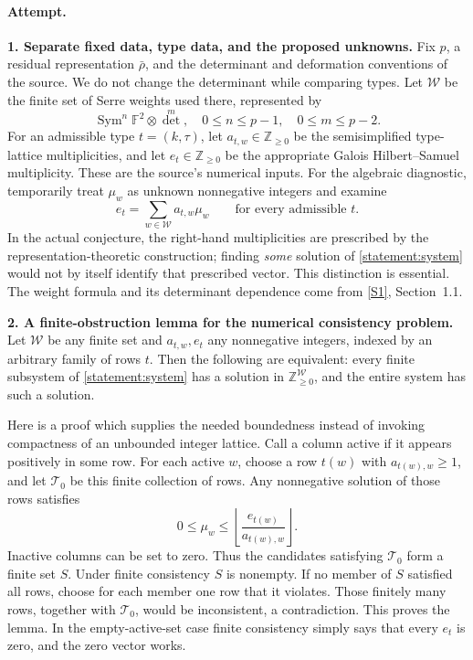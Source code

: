 \documentclass[11pt,a4paper]{article}
\newcommand{\Z}{\mathbb{Z}}
\newcommand{\F}{\mathbb{F}}
\newcommand{\sref}[2]{\hyperlink{source:#1:#2}{[S#2]}}
\numberwithin{equation}{section}
\begin{document}
\paragraph{Attempt.}
\textbf{1. Separate fixed data, type data, and the proposed unknowns.}
Fix $p$, a residual representation $\bar\rho$, and the determinant and
deformation conventions of the source. We do not change the determinant
while comparing types. Let $\mathcal W$ be the finite set of Serre
weights used there, represented by
\[
 \operatorname{Sym}^n\F^2\otimes\det^m,
       \quad 0\le n\le p-1,\quad0\le m\le p-2.
\]
For an admissible type $t=(k,\tau)$, let $a_{t,w}\in\Z_{\ge0}$ be the
semisimplified type-lattice multiplicities, and let $e_t\in\Z_{\ge0}$
be the appropriate Galois Hilbert--Samuel multiplicity. These are the
source's numerical inputs. For the algebraic diagnostic, temporarily
treat $\mu_w$ as unknown nonnegative integers and examine
\begin{equation}\label{statement:system}
 e_t=\sum_{w\in\mathcal W}a_{t,w}\mu_w
                      \qquad\text{for every admissible }t.
\end{equation}
In the actual conjecture, the right-hand multiplicities are prescribed
by the representation-theoretic construction; finding \emph{some}
solution of \eqref{statement:system} would not by itself identify that
prescribed vector. This distinction is essential. The weight formula
and its determinant dependence come from \sref{statement}{1}, Section~1.1.

\textbf{2. A finite-obstruction lemma for the numerical consistency problem.}
Let $\mathcal W$ be any finite set and $a_{t,w},e_t$ any nonnegative
integers, indexed by an arbitrary family of rows $t$. Then the following
are equivalent: every finite subsystem of \eqref{statement:system} has a
solution in $\Z_{\ge0}^{\mathcal W}$, and the entire system has such a
solution.

Here is a proof which supplies the needed boundedness instead of invoking
compactness of an unbounded integer lattice. Call a column active if it
appears positively in some row. For each active $w$, choose a row
$t(w)$ with $a_{t(w),w}\ge1$, and let $\mathcal T_0$ be this finite
collection of rows. Any nonnegative solution of those rows satisfies
\begin{equation}\label{statement:box}
 0\le\mu_w\le
 \left\lfloor\frac{e_{t(w)}}{a_{t(w),w}}\right\rfloor.
\end{equation}
Inactive columns can be set to zero. Thus the candidates satisfying
$\mathcal T_0$ form a finite set $S$. Under finite consistency $S$ is
nonempty. If no member of $S$ satisfied all rows, choose for each member
one row that it violates. Those finitely many rows, together with
$\mathcal T_0$, would be inconsistent, a contradiction. This proves
the lemma. In the empty-active-set case finite consistency simply says
that every $e_t$ is zero, and the zero vector works.
\end{document}
